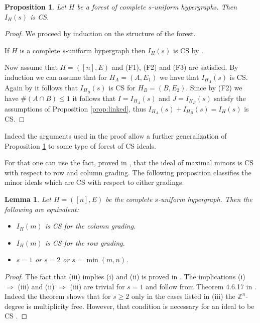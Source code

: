 \documentclass{amsart}
\newtheorem{lemma}[theorem]{Lemma}
\newtheorem{proposition}[theorem]{Proposition}
\theoremstyle{definition}
\numberwithin{equation}{section}
\def\ZZ{\mathbb{Z}}
\begin{document}
\begin{proposition} \label{prop:snaketrees}
Let $H$ be a forest of complete $s$-uniform hypergraphs.
Then $I_H(s)$ is CS.
  \end{proposition}
  \begin{proof} 
    We proceed by induction on the structure of the forest.
    
    If $H$ is a complete $s$-uniform hypergraph then 
    $I_H(s)$ is CS by \cite[Theorem 3.1]{CDG3}. 
    
    Now assume that 
    $H = ([n],E)$ and (F1), (F2) and (F3) are 
    satisfied. By induction we can assume that 
    for $H_A = (A,E_1)$ we have that $I_{H_A}(s)$ is
    CS. Again by \cite[ Theorem 3.1]{CDG3} it follows that 
    $I_{H_B}(s)$ is CS for $H_B = (B,E_2)$. 
    Since by (F2) we have $\#(A \cap B) \leq 1$ it follows 
    that $I = I_{H_A}(s)$ and $J = I_{H_B}(s)$ satisfy the
    assumptions of Proposition \ref{prop:linked}, thus $I_{H_A}(s) + I_{H_B}(s) = I_H(s)$ is
    CS.
\end{proof}

Indeed the arguments used in the proof allow a further
generalization of Proposition \ref{prop:snaketrees} to 
some type of forest of CS ideals. 

For that one can use the fact, proved in \cite[Theorem 2.2, Theorem 3.1]{CDG1},  
that the ideal of maximal minors is CS with respect to
row and column grading. 
The following proposition classifies the minor ideals
which are CS with respect to either gradings.
 

\begin{lemma} \label{lem:colrow}
    Let $H = ([n],E)$ be the complete $s$-uniform hypergraph.
    Then the following are equivalent:
\begin{itemize}
    \item[(i)] $I_H(m) $ is CS for the column grading.
    \item[(ii)] $I_H(m) $ is CS for the row grading.
    \item[(iii)] $s =1$ or $s =2$ or $s = \min (m,n)$.
    \end{itemize}
\end{lemma}
\begin{proof}
The fact that (iii) implies (i) and (ii) is proved in
\cite{CDG1}. 
The implications (i) $\Rightarrow$ (iii) and 
(ii) $\Rightarrow$ (iii) are trivial for $s =1$ and 
follow from Theorem 4.6.17 in
\cite{BCRV}. Indeed the theorem shows that for $s \geq 2$ only in the cases listed in (iii) the $\ZZ^n$-degree is multiplicity free. However, that condition is necessary for an ideal to be CS \cite[Proposition 2.6]{CDG4}.
\end{proof}
\end{document}
